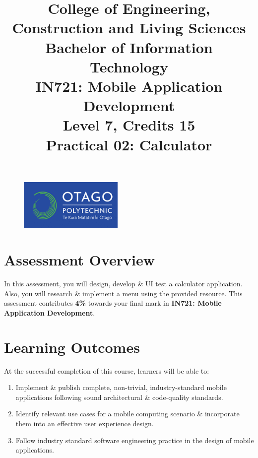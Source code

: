 \documentclass{article}
\author{}
\begin{document}
\begin{figure}
	\centering
	\includegraphics[width=50mm]{../../resources/img/logo.png}
\end{figure}

\title{College of Engineering, Construction and Living Sciences\\Bachelor of Information Technology\\IN721: Mobile Application Development\\Level 7, Credits 15\\\textbf{Practical 02: Calculator}}
\date{}
\maketitle

\section*{Assessment Overview}
In this assessment, you will design, develop \& UI test a calculator application. Also, you will research \& implement a menu using the provided resource. This assessment contributes \textbf{4\%} towards your final mark in \textbf{IN721: Mobile Application Development}.

\section*{Learning Outcomes}
At the successful completion of this course, learners will be able to:
\begin{enumerate}
	\item Implement \& publish complete, non-trivial, industry-standard mobile applications following sound architectural \& code-quality standards.
	\item Identify relevant use cases for a mobile computing scenario \& incorporate them into an effective user experience design.
	\item Follow industry standard software engineering practice in the design of mobile applications.
\end{enumerate}
\end{document}
